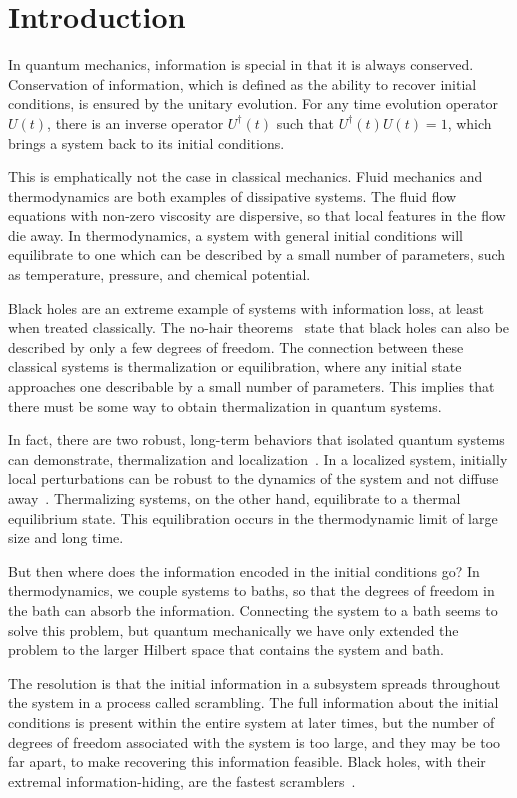 \section{Introduction} \label{sec:intro}

In quantum mechanics, information is special in that it is always conserved. Conservation of information, which is defined as the ability to recover initial conditions, is ensured by the unitary evolution. For any time evolution operator $U(t)$, there is an inverse operator $U^\dag(t)$ such that $U^\dag(t)U(t)=1$, which brings a system back to its initial conditions. 

This is emphatically not the case in classical mechanics. Fluid mechanics and thermodynamics are both examples of dissipative systems. The fluid flow equations with non-zero viscosity are dispersive, so that local features in the flow die away. In thermodynamics, a system with general initial conditions will equilibrate to one which can be described by a small number of parameters, such as temperature, pressure, and chemical potential.

Black holes are an extreme example of systems with information loss, at least when treated classically. The no-hair theorems~\cite{Israel1967, Israel1968, Carter71} state that black holes can also be described by only a few degrees of freedom. The connection between these classical systems is thermalization or equilibration, where any initial state approaches one describable by a small number of parameters. This implies that there must be some way to obtain thermalization in quantum systems.

In fact, there are two robust, long-term behaviors that isolated quantum systems can demonstrate, thermalization and localization~\cite{Nandkishore2015}. In a localized system, initially local perturbations can be robust to the dynamics of the system and not diffuse away~\cite{Anderson58}. Thermalizing systems, on the other hand, equilibrate to a thermal equilibrium state. This equilibration occurs in the thermodynamic limit of large size and long time. 

But then where does the information encoded in the initial conditions go? In thermodynamics, we couple systems to baths, so that the degrees of freedom in the bath can absorb the information. Connecting the system to a bath seems to solve this problem, but quantum mechanically we have only extended the problem to the larger Hilbert space that contains the system and bath. 

The resolution is that the initial information in a subsystem spreads throughout the system in a process called scrambling. The full information about the initial conditions is present within the entire system at later times, but the number of degrees of freedom associated with the system is too large, and they may be too far apart, to make recovering this information feasible. Black holes, with their extremal information-hiding, are the fastest scramblers~\cite{Sekino2008, Maldacena2016}.

